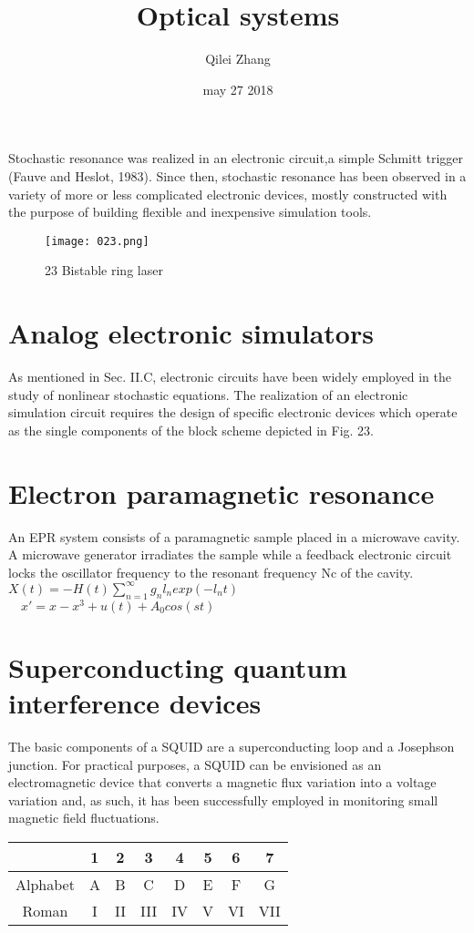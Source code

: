 \documentclass[10pt]{article}
\begin{document}
\title{Optical systems}
\author{Qilei Zhang}
\date{may 27 2018}
\maketitle
\par
Stochastic resonance was realized in an electronic circuit,a simple Schmitt trigger (Fauve and Heslot, 1983). Since then, stochastic resonance has been observed in a variety of more or less complicated electronic devices, mostly constructed with the purpose of building flexible and inexpensive simulation tools.\cite{Alpher02}
\par
\begin{figure}[htbp]
\small
\centering
\texttt{[image: 023.png]}
\caption{23 Bistable ring laser}
\label{fig:lable}
\end{figure}
\section{Analog electronic simulators}
As mentioned in Sec. II.C, electronic circuits have been widely employed in the study of nonlinear stochastic equations. The realization of an electronic simulation circuit requires the design of specific electronic devices which operate as the single components of the block scheme depicted in Fig. 23.
\section{Electron paramagnetic resonance}
An EPR system consists of a paramagnetic sample placed in a microwave cavity. A microwave generator irradiates the sample while a feedback electronic circuit locks the oscillator frequency to the resonant frequency Nc of the cavity.\cite{Alpher03}\\
$X(t)=-H(t)\sum_{n=1}^\infty g_n l_n exp(-l_n t)$\\
$\quad x'=x-x^3+u(t)+A_0 cos(st)$
\section{Superconducting quantum interference devices}
The basic components of a SQUID are a superconducting loop and a Josephson junction. For practical purposes, a SQUID can be envisioned as an electromagnetic device that converts a magnetic flux variation into a voltage variation and, as such, it has been successfully employed in monitoring small magnetic field fluctuations.\cite{Alpher04}\\
\begin{tabular}{cccccccc}
\toprule
         & 1 &  2  &   3  &  4  &  5  &  6  & 7 \\
\midrule
Alphabet & A &  B  &   C  &  D  &  E  &  F  & G\\
Roman    & I &  II &  III &  IV &  V  &  VI & VII\\
\bottomrule
\end{tabular}

\end{document}
